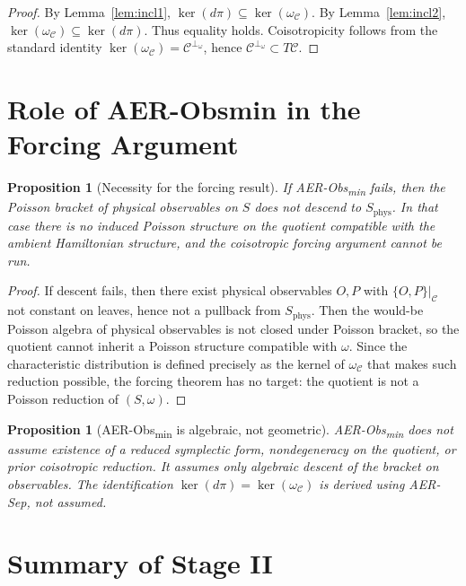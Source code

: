 \documentclass[11pt]{article}
\newtheorem{proposition}[definition]{Proposition}
\theoremstyle{remark}
\theoremstyle{plain}
\begin{document}
\begin{proof}
By Lemma~\ref{lem:incl1}, $\ker(d\pi)\subseteq\ker(\omega_{\mathcal{C}})$.
By Lemma~\ref{lem:incl2}, $\ker(\omega_{\mathcal{C}})\subseteq\ker(d\pi)$.
Thus equality holds. Coisotropicity follows from the standard identity $\ker(\omega_{\mathcal{C}})=\mathcal{C}^{\perp_\omega}$, hence $\mathcal{C}^{\perp_\omega}\subset T\mathcal{C}$.
\end{proof}

\section{Role of AER-Obsmin in the Forcing Argument}

\begin{proposition}[Necessity for the forcing result]
If AER-Obs\textsubscript{min} fails, then the Poisson bracket of physical observables on $S$ does not descend to $S_{\mathrm{phys}}$.
In that case there is no induced Poisson structure on the quotient compatible with the ambient Hamiltonian structure, and the coisotropic forcing argument cannot be run.
\end{proposition}

\begin{proof}
If descent fails, then there exist physical observables $O,P$ with $\{O,P\}|_{\mathcal{C}}$ not constant on leaves, hence not a pullback from $S_{\mathrm{phys}}$.
Then the would-be Poisson algebra of physical observables is not closed under Poisson bracket, so the quotient cannot inherit a Poisson structure compatible with $\omega$.
Since the characteristic distribution is defined precisely as the kernel of $\omega_{\mathcal{C}}$ that makes such reduction possible, the forcing theorem has no target: the quotient is not a Poisson reduction of $(S,\omega)$.
\end{proof}

\begin{proposition}[AER-Obs\textsubscript{min} is algebraic, not geometric]
AER-Obs\textsubscript{min} does not assume existence of a reduced symplectic form, nondegeneracy on the quotient, or prior coisotropic reduction.
It assumes only algebraic descent of the bracket on observables.
The identification $\ker(d\pi)=\ker(\omega_{\mathcal{C}})$ is derived using AER-Sep, not assumed.
\end{proposition}

\section{Summary of Stage II}
\end{document}
